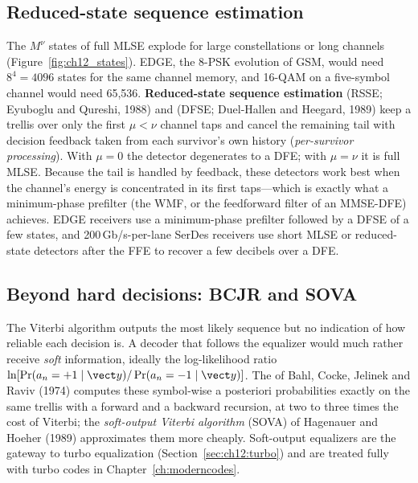 
\subsection{Reduced-state sequence estimation}

The $M^\nu$ states of full MLSE explode for large constellations or long channels
(Figure~\ref{fig:ch12_states}). EDGE, the 8-PSK evolution of GSM, would need $8^4=4096$ states for
the same channel memory, and 16-QAM on a five-symbol channel would need 65{,}536.
\textbf{Reduced-state sequence estimation} (RSSE; Eyuboglu
and Qureshi, 1988) and  (DFSE; Duel-Hallen and Heegard,
1989) keep a trellis over only the first $\mu<\nu$ channel taps and cancel the remaining tail with
decision feedback taken from each survivor's own history (\emph{per-survivor processing}). With
$\mu=0$ the detector degenerates to a DFE; with $\mu=\nu$ it is full MLSE. Because the tail is
handled by feedback, these detectors work best when the channel's energy is concentrated in its
first taps---which is exactly what a minimum-phase prefilter (the WMF, or the feedforward filter of an
MMSE-DFE) achieves. EDGE receivers use a minimum-phase prefilter followed by a DFSE of a few states,
and 200\,Gb/s-per-lane SerDes receivers use short MLSE or reduced-state detectors after the FFE to
recover a few decibels over a DFE.

\subsection{Beyond hard decisions: BCJR and SOVA}

The Viterbi algorithm outputs the most likely sequence but no indication of how reliable each
decision is. A decoder that follows the equalizer would much rather receive \emph{soft} information,
ideally the log-likelihood ratio $\ln[\Pr(a_n=+1\mid\vect y)/\Pr(a_n=-1\mid\vect y)]$. The
 of Bahl, Cocke, Jelinek and Raviv (1974) computes these symbol-wise a
posteriori probabilities exactly on the same trellis with a forward and a backward recursion, at two
to three times the cost of Viterbi; the \emph{soft-output Viterbi algorithm} (SOVA) of Hagenauer and
Hoeher (1989) approximates them more cheaply. Soft-output equalizers are the gateway to turbo
equalization (Section~\ref{sec:ch12:turbo}) and are treated fully with turbo codes in
Chapter~\ref{ch:moderncodes}.


